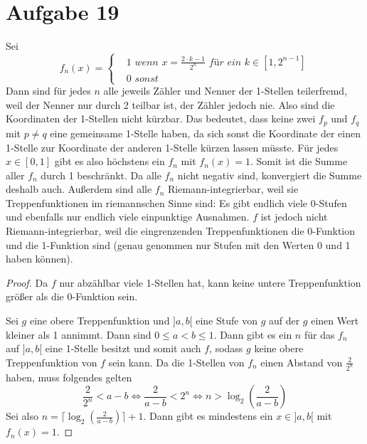 \documentclass[10pt,a4paper]{article}
\begin{document}
\section{Aufgabe 19}
Sei
\begin{equation}
  f_{n}(x) = 
  \begin{cases}
    & 1\textit{ wenn $x = \frac{2 \cdot k - 1}{2^{n}}$ für ein $k \in [1, 2^{n - 1}]$}\\
    & 0\textit{ sonst}
  \end{cases}
\end{equation}
Dann sind für jedes $n$ alle jeweils Zähler und Nenner der 1-Stellen teilerfremd, weil der Nenner nur durch 2 teilbar ist, der Zähler jedoch nie.
Also sind die Koordinaten der 1-Stellen nicht kürzbar.
Das bedeutet, dass keine zwei $f_{p}$ und $f_{q}$ mit $p \ne q$ eine gemeinsame 1-Stelle haben, da sich sonst die Koordinate der einen 1-Stelle zur Koordinate der anderen 1-Stelle kürzen lassen müsste.
Für jedes $x \in [0, 1]$ gibt es also höchstens ein $f_{n}$ mit $f_{n}(x) = 1$.
Somit ist die Summe aller $f_{n}$ durch 1 beschränkt.
Da alle $f_{n}$ nicht negativ sind, konvergiert die Summe deshalb auch.
Außerdem sind alle $f_{n}$ Riemann-integrierbar, weil sie Treppenfunktionen im riemannschen Sinne sind: Es gibt endlich viele 0-Stufen und ebenfalls nur endlich viele einpunktige Ausnahmen.
$f$ ist jedoch nicht Riemann-integrierbar, weil die eingrenzenden Treppenfunktionen die 0-Funktion und die 1-Funktion sind (genau genommen nur Stufen mit den Werten 0 und 1 haben können).
\begin{proof}
  Da $f$ nur abzählbar viele 1-Stellen hat, kann keine untere Treppenfunktion größer als die 0-Funktion sein.

  Sei $g$ eine obere Treppenfunktion und $]a, b[$ eine Stufe von $g$ auf der $g$ einen Wert kleiner als 1 annimmt.
  Dann sind $0 \le a < b \le 1$.
  Dann gibt es ein $n$ für das $f_{n}$ auf $]a, b[$ eine 1-Stelle besitzt und somit auch $f$, sodass $g$ keine obere Treppenfunktion von $f$ sein kann.
  Da die 1-Stellen von $f_{n}$ einen Abstand von $\frac{2}{2^{n}}$ haben, muss folgendes gelten
  \begin{equation}
    \frac{2}{2^{n}} < a - b \Leftrightarrow \frac{2}{a - b} < 2^{n} \Leftrightarrow n > \log_{2}(\frac{2}{a - b})
  \end{equation}
  Sei also $n = \lceil \log_{2}(\frac{2}{a - b}) \rceil + 1$.
  Dann gibt es mindestens ein $x \in ]a, b[$ mit $f_{n}(x) = 1$.
\end{proof}
\end{document}
